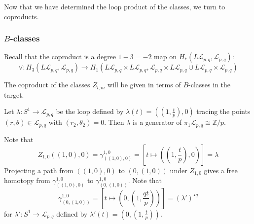 \documentclass[reqno]{amsart}
\theoremstyle{definition}
\theoremstyle{remark}
\begin{document}
Now that we have determined the loop product of the
classes, we turn to coproducts.

\subsubsection{$B$-classes}


Recall that the coproduct is a degree $1-3 = -2$ map on
$H_* (L \mathcal{L}_{p,q}, \mathcal{L}_{p,q})$:
\[
\vee \colon H_3 \left( L \mathcal{L}_{p,q}, \mathcal{L}_{p,q} \right) 
\to H_1 \left( L \mathcal{L}_{p,q} \times L \mathcal{L}_{p,q},
\mathcal{L}_{p,q} \times L \mathcal{L}_{p,q} \cup 
L \mathcal{L}_{p,q} \times \mathcal{L}_{p,q} \right) 
\] 

The coproduct of the classes
$Z_{l,m}$ will be given in terms of $B$-classes in the
target.


Let $\lambda \colon S^{1} \to \mathcal{L}_{p,q}$ be the
loop defined by $\lambda(t) = \left( (1, \frac{t}{p}),
0
\right) $ tracing the points $(r,\theta) \in \mathcal{L}_{p,q}$ 
with $\left( r_2, \theta_2 \right) = 0$. Then
$\lambda$ is a generator of
$\pi_1 \mathcal{L}_{p,q} \cong \mathbb{Z} / p$.

Note that
\[
    Z_{1,0}\left( (1,0), 0 \right) =
    \gamma_{\left( (1,0), 0 \right) }^{1,0} = 
    \left[ t \mapsto \left( (1, \frac{t}{p}), 0  \right)  \right] = 
    \lambda
\] 
Projecting a path
from $\left( \left( 1,0 \right) , 0 \right) $ to
$\left( 0, (1,0) \right) $ under
$Z_{1,0}$ gives a free homotopy
from
$\gamma_{\left( (1,0),0 \right) }^{1,0}$ to
$\gamma_{\left( 0, (1,0) \right) }^{1,0}$. Note that
\[
\gamma_{\left( 0, (1,0) \right) }^{1,0} = 
\left[ t \mapsto \left( 0, (1, \frac{qt}{p}) \right)  \right] 
= ( \lambda' )^{\star q}
\] 
for $\lambda' \colon S^{1} \to \mathcal{L}_{p,q}$ defined
by $\lambda' (t) = \left( 0, (1, \frac{t}{p}) \right) $.
\end{document}
